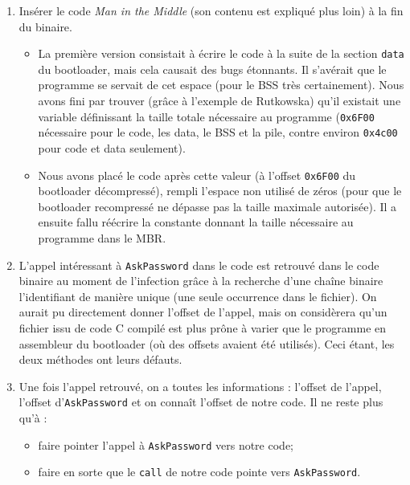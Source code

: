 \documentclass[12pt,a4paper]{article}
\begin{document}
\begin{enumerate}
    \item Insérer le code \textit{Man in the Middle} (son contenu est expliqué plus loin)
    à la fin du binaire.
    \begin{itemize}
        \item La première version consistait à écrire le code à la suite de la
        section \texttt{data} du bootloader, mais cela causait des bugs étonnants.
        Il s'avérait que le programme se servait de cet espace (pour le BSS très
        certainement). Nous avons fini par trouver (grâce à l'exemple de
        Rutkowska) qu'il existait une variable définissant la taille totale
        nécessaire au programme (\texttt{0x6F00} nécessaire pour le code, les
        data, le BSS et la pile, contre environ \texttt{0x4c00} pour code et data
        seulement).
        \item Nous avons placé le code après cette valeur (à l'offset \texttt{0x6F00} du
        bootloader décompressé), rempli l'espace non utilisé de zéros (pour que le
        bootloader recompressé ne dépasse pas la taille maximale autorisée). Il
        a ensuite fallu réécrire la constante donnant la taille nécessaire au 
        programme dans le MBR.
    \end{itemize}
    \item L'appel intéressant à \texttt{AskPassword} dans le code est retrouvé
    dans le code binaire au moment de l'infection grâce à la recherche d'une
    chaîne binaire l'identifiant de manière unique (une seule occurrence dans
    le fichier). On aurait pu directement donner l'offset de l'appel, mais on
    considèrera qu'un fichier issu de code C compilé est plus prône à varier
    que le programme en assembleur du bootloader (où des offsets avaient été
    utilisés). Ceci étant, les deux méthodes ont leurs défauts.
    \item Une fois l'appel retrouvé, on a toutes les informations : l'offset de
    l'appel, l'offset d'\texttt{AskPassword} et on connaît l'offset de notre code.
    Il ne reste plus qu'à :
    \begin{itemize}
        \item faire pointer l'appel à \texttt{AskPassword} vers notre code;
        \item faire en sorte que le \texttt{call} de notre code pointe vers
        \texttt{AskPassword}.
    \end{itemize}
\end{enumerate}
\end{document}
